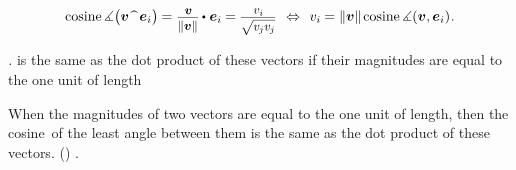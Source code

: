 \nopagebreak\vspace{-0.2em}\begin{equation}\label{anglesbetweenvectorandbasisvectors}
\cosine \measuredangle \bigl( \bm{v} \widehat{\phantom{w}} \bm{e}_i \bigr) %
\hspace{-0.1ex}
= \scalebox{.9}{$ \displaystyle\frac{\hspace{.2ex}\raisemath{-0.16em}{\bm{v}}}{\raisemath{-0.05em}{\|\bm{v}\|}} $} \hspace{-0.1ex} \dotp \hspace{.1ex} \bm{e}_i \hspace{-0.1ex}
= \hspace{-0.1ex}\scalebox{.9}{$ \displaystyle\frac{\hspace{.2ex}\raisemath{-0.12em}{v_i}}{\raisemath{-0.1em}{\sqrt{\vphantom{i} v_{\hspace{-0.1ex}j} v_{\hspace{-0.1ex}j}}}} $}
\hspace{.4em}\Leftrightarrow\hspace{.4em}
\tikzmark{beginComponentOfVectorThruLengthAndCosine} v_i \hspace{.3ex} \tikzmark{endComponentOfVectorThruLengthAndCosine} \hspace{-0.4ex} = \|\bm{v}\| \hspace{-0.1ex} \cosine \measuredangle ({\bm{v}, \bm{e}_i})
\hspace{.1ex} .
\end{equation}%
%
{}
\vspace{-0.6em}

\emph{.}
is the same as the dot product of these vectors
if their magnitudes are equal to the one unit of length

When the magnitudes of two vectors
are equal to the one unit of length,
then the cosine of the least angle between them
is the same as the dot product of these vectors.
()
.


